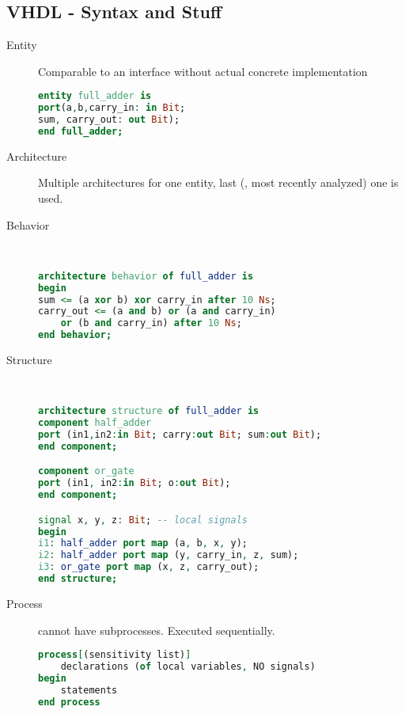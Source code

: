 \subsection*{VHDL - Syntax and Stuff}
\begin{description}
	\item[Entity] Comparable to an interface without actual concrete implementation
	\begin{lstlisting}[language=vhdl]
entity full_adder is
port(a,b,carry_in: in Bit;
sum, carry_out: out Bit);
end full_adder;
	\end{lstlisting}

	\item[Architecture] Multiple architectures for one entity, last (\ie, most
	recently analyzed) one is used.
	\item[Behavior]\ 
	\begin{lstlisting}[language=vhdl]
architecture behavior of full_adder is
begin
sum <= (a xor b) xor carry_in after 10 Ns;
carry_out <= (a and b) or (a and carry_in) 
	or (b and carry_in) after 10 Ns;
end behavior;
	\end{lstlisting}

	\item[Structure]\ 
	\begin{lstlisting}[language=vhdl]
architecture structure of full_adder is 
component half_adder
port (in1,in2:in Bit; carry:out Bit; sum:out Bit); 
end component; 

component or_gate
port (in1, in2:in Bit; o:out Bit);
end component;

signal x, y, z: Bit; -- local signals
begin
i1: half_adder port map (a, b, x, y);
i2: half_adder port map (y, carry_in, z, sum); 
i3: or_gate port map (x, z, carry_out);
end structure;
	\end{lstlisting}
	
	\item[Process] cannot have subprocesses. Executed sequentially.
	\begin{lstlisting}[language=vhdl]
process[(sensitivity list)]
	declarations (of local variables, NO signals)
begin
	statements
end process
	\end{lstlisting}


\end{description}
